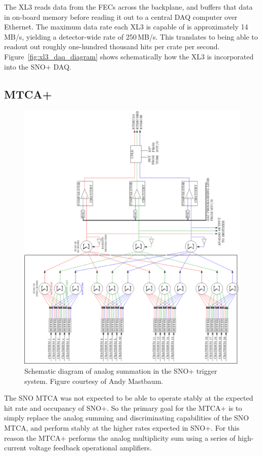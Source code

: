The XL3 reads data from the FECs across the backplane, and buffers that data
in on-board memory before reading it out to a central DAQ computer over Ethernet.
The maximum data rate each XL3 is capable of is approximately
14\,MB/s, yielding a detector-wide rate of 250\,MB/s.
This translates to being able to readout out roughly one-hundred thousand
hits per crate per second.
Figure~\ref{fig:xl3_daq_diagram} shows schematically how the XL3 is
incorporated into the SNO+ DAQ\@.

\subsection{MTCA+}
\label{sec:mtcap}
\begin{figure}[htbp]
    \centering
    \includegraphics[width=1\textwidth]{mtcap_analog_diagram}
    \caption[MTCA+ Analog Diagram]{Schematic diagram of analog
    summation in the SNO+ trigger system. Figure courtesy of
    Andy Mastbaum.}%
\label{fig:mtcap_analog_diagram}
\end{figure}

The SNO MTCA was not expected to be able to operate stably at the expected
hit rate and occupancy of SNO+.
So the primary goal for the MTCA+ is to simply replace the analog summing
and discriminating capabilities of the SNO MTCA, and perform stably
at the higher rates expected in SNO+.
For this reason the MTCA+ performs the analog multiplicity sum using a series
of high-current voltage feedback operational amplifiers.

